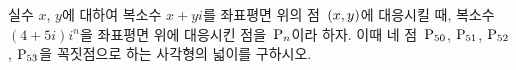 실수 $x$, $y$에 대하여 복소수 $x+yi$를 좌표평면 위의 점~$(x{,}\mkern3mu\mathopen{}y)$에 대응시킬 때, 복소수 $(4+5i)i^n$을 좌표평면 위에 대응시킨 점을~$\mathrm{P}_n$이라 하자. 이때 네 점~$\mathrm{P}_{50}$, $\mathrm{P}_{51}$, $\mathrm{P}_{52}$, $\mathrm{P}_{53}$을 꼭짓점으로 하는 사각형의 넓이를 구하시오. 
